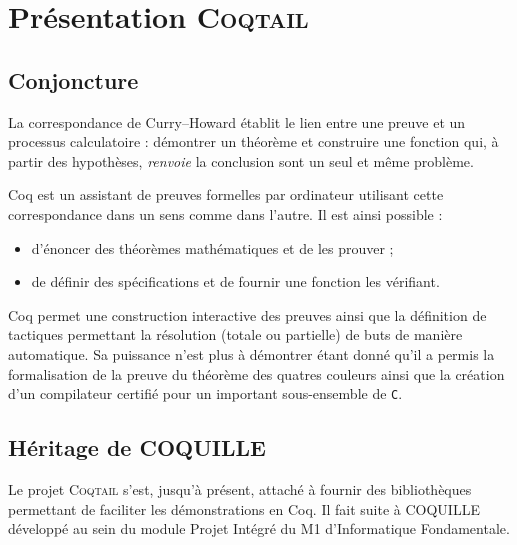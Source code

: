 \documentclass[11pt]{article}
\newcommand{\coqtail}{\textsc{Coqtail}}
\begin{document}


\section{Présentation \coqtail{}}


\subsection{Conjoncture}

La correspondance de Curry--Howard établit le lien entre une preuve et un processus calculatoire : démontrer un théorème et construire une fonction qui, à partir des hypothèses, \emph{renvoie} la conclusion sont un seul et même problème.

Coq\cite{L:BC04} est un assistant de preuves formelles par ordinateur utilisant cette correspondance dans un sens comme dans l'autre. Il est ainsi possible :
\begin{itemize}
  \item d'énoncer des théorèmes mathématiques et de les prouver ;
  \item de définir des spécifications et de fournir une fonction les vérifiant.
\end{itemize}

Coq permet une construction interactive des preuves ainsi que la définition de tactiques permettant la résolution (totale ou partielle) de buts de manière automatique. Sa puissance n'est plus à démontrer étant donné qu'il a permis la formalisation de la preuve du théorème des quatres couleurs\cite{Gonthier07} ainsi que la création d'un compilateur certifié pour un important sous-ensemble de \texttt{C}\cite{compcert}.

\subsection{Héritage de COQUILLE}

Le projet \coqtail{} s'est, jusqu'à présent, attaché à fournir des bibliothèques permettant de faciliter les démonstrations en Coq. Il fait suite à COQUILLE développé au sein du module Projet Intégré du M1 d'Informatique Fondamentale.
\end{document}
